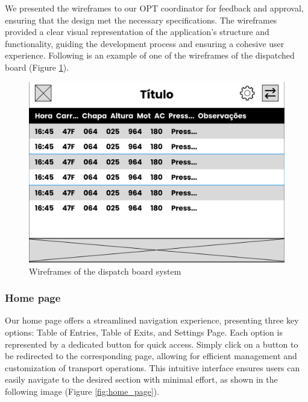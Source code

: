 \documentclass[10pt]{article}
\begin{document}
        We presented the wireframes to our OPT coordinator for feedback and approval, ensuring that the design met the necessary specifications. The wireframes provided a clear visual representation of the application's structure and functionality, guiding the development process and ensuring a cohesive user experience. Following is an example of one of the wireframes of the dispatched board (Figure \ref{fig:wireframes}).

        \begin{figure}[htbp]
            \centering
            \includegraphics[width=1\textwidth]{wireframe}
            \caption{Wireframes of the dispatch board system}
            \label{fig:wireframes}
        \end{figure}
        

        \subsubsection{Home page}

        Our home page offers a streamlined navigation experience, presenting three key options: Table of Entries, Table of Exits, and Settings Page. Each option is represented by a dedicated button for quick access. Simply click on a button to be redirected to the corresponding page, allowing for efficient management and customization of transport operations. This intuitive interface ensures users can easily navigate to the desired section with minimal effort, as shown in the following image (Figure \ref{fig:home_page}).
\end{document}
